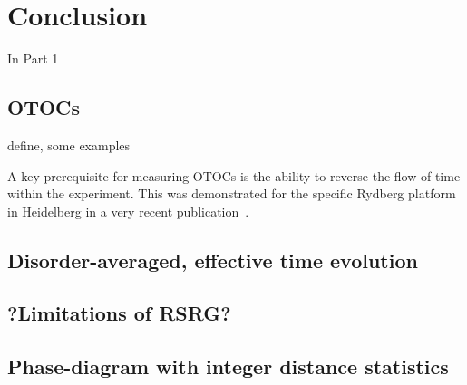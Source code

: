 \chapter{Conclusion}
In Part 1

\section{OTOCs}
define, some examples

A key prerequisite for measuring OTOCs is the ability to reverse the flow of time within the experiment. This was demonstrated for the specific Rydberg platform in Heidelberg in a  very recent publication~\cite{geierTimereversalDipolarQuantum2024}.

\cite{muellenbachOTOC}

\section{Disorder-averaged, effective time evolution}

\section{?Limitations of RSRG?}
\cite{burinLocalizationRandomXY2015}

\section{Phase-diagram with integer distance statistics}

